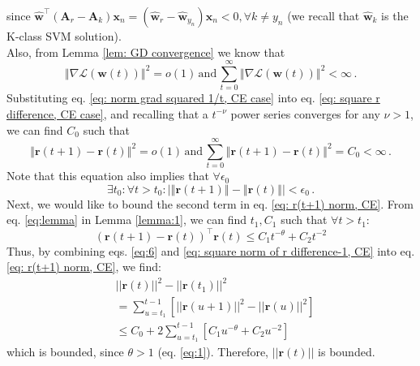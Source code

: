 \documentclass[twoside,11pt,english]{article}
\newcommand{\vect}[1]{\mathbf{#1}}
\begin{document}
since $\hat{\vect{w}}^\top(\vect{A}_r-\vect{A}_k)\vect{x}_n=(\hat{\vect{w}}_r-\hat{\vect{w}}_{y_n})\vect{x}_n<0, \forall k \ne y_n$ (we recall that $\hat{\vect{w}}_k$ is the K-class SVM solution).\\
Also, from Lemma \ref{lem: GD convergence} we know that 
\begin{equation}
\left\Vert \nabla\mathcal{L}\left(\mathbf{w}\left(t\right)\right)\right\Vert ^{2}=o\left(1\right)\,\mathrm{and}\,\sum_{t=0}^{\infty}\left\Vert \nabla\mathcal{L}\left(\mathbf{w}\left(t\right)\right)\right\Vert ^{2}<\infty\,.\label{eq: norm grad squared 1/t, CE case}
\end{equation}
Substituting eq. \ref{eq: norm grad squared 1/t, CE case} into eq. \ref{eq: square r difference, CE case},
and recalling that a $t^{-\nu}$ power series converges for any $\nu>1$,
we can find $C_{0}$ such that 
\begin{equation} \label{eq: square norm of r difference-1, CE}
\left\Vert \mathbf{r}\left(t+1\right)-\mathbf{r}\left(t\right)\right\Vert ^{2}=o\left(1\right)\,\mathrm{and}\,\sum_{t=0}^{\infty}\left\Vert \mathbf{r}\left(t+1\right)-\mathbf{r}\left(t\right)\right\Vert ^{2}=C_{0}<\infty\,.
\end{equation}
Note that this equation also implies that $\forall\epsilon_{0}$ 
\begin{equation}
\exists t_{0}:\forall t>t_{0}:\left|\left\Vert \mathbf{r}\left(t+1\right)\right\Vert -\left\Vert \mathbf{r}\left(t\right)\right\Vert \right|<\epsilon_{0}\,.
\end{equation}
Next, we would like to bound the second term in eq. \ref{eq: r(t+1) norm, CE}. From eq. \ref{eq:lemma} in Lemma \ref{lemma:1}, we can find $t_1,C_1$ such that $\forall t>t_1$:
\begin{equation} \label{eq:6}
(\vect{r}(t+1)-\vect{r}(t))^\top\vect{r}(t)\le C_1t^{-\theta}+C_2t^{-2}
\end{equation}
Thus, by combining eqs. \ref{eq:6} and \ref{eq: square norm of r difference-1, CE} into eq. \ref{eq: r(t+1) norm, CE}, we find:
\begin{align*}
&||\vect{r}(t)||^2-||\vect{r}(t_1)||^2\\
&=\sum_{u=t_1}^{t-1}\left[||\vect{r}(u+1)||^2-||\vect{r}(u)||^2\right]\\
&\le C_0+2\sum_{u=t_1}^{t-1} \left[C_1u^{-\theta}+C_2u^{-2}\right]
\end{align*}
which is bounded, since $\theta>1$ (eq. \ref{eq:1}). Therefore, $||\vect{r}(t)||$ is bounded.
\end{document}
